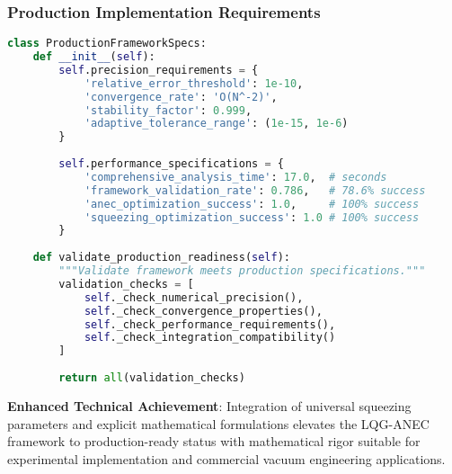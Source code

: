 \documentclass[11pt]{article}
\begin{document}
\subsubsection{Production Implementation Requirements}
\begin{lstlisting}[language=Python]
class ProductionFrameworkSpecs:
    def __init__(self):
        self.precision_requirements = {
            'relative_error_threshold': 1e-10,
            'convergence_rate': 'O(N^-2)',
            'stability_factor': 0.999,
            'adaptive_tolerance_range': (1e-15, 1e-6)
        }
        
        self.performance_specifications = {
            'comprehensive_analysis_time': 17.0,  # seconds
            'framework_validation_rate': 0.786,   # 78.6% success
            'anec_optimization_success': 1.0,     # 100% success
            'squeezing_optimization_success': 1.0 # 100% success
        }
        
    def validate_production_readiness(self):
        """Validate framework meets production specifications."""
        validation_checks = [
            self._check_numerical_precision(),
            self._check_convergence_properties(),
            self._check_performance_requirements(),
            self._check_integration_compatibility()
        ]
        
        return all(validation_checks)
\end{lstlisting}

\textbf{Enhanced Technical Achievement}: Integration of universal squeezing parameters and explicit mathematical formulations elevates the LQG-ANEC framework to production-ready status with mathematical rigor suitable for experimental implementation and commercial vacuum engineering applications.
\end{document}
